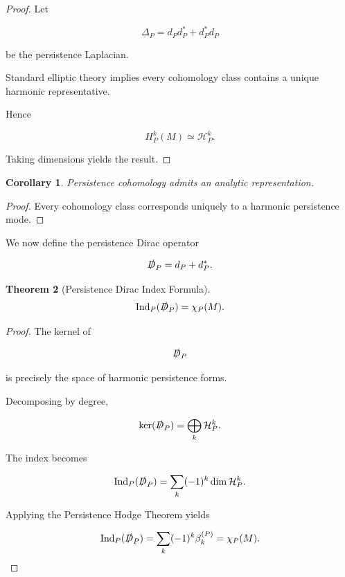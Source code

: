 \documentclass[12pt,oneside]{article}
\newtheorem{theorem}{Theorem}[section] \newtheorem{lemma}[theorem]{Lemma} \newtheorem{proposition}[theorem]{Proposition} \newtheorem{corollary}[theorem]{Corollary}
\theoremstyle{definition}
\begin{document}
\begin{proof}

Let

\[
\Delta_P
=
d_P d_P^\ast
+
d_P^\ast d_P
\]

be the persistence Laplacian.

Standard elliptic theory implies every cohomology class contains a unique harmonic representative.

Hence

\[
H_P^k(M)
\simeq
\mathcal H_P^k.
\]

Taking dimensions yields the result.

\end{proof}

\begin{corollary}

Persistence cohomology admits an analytic representation.

\end{corollary}

\begin{proof}

Every cohomology class corresponds uniquely to a harmonic persistence mode.

\end{proof}

We now define the persistence Dirac operator

\[
\slashed D_P
=
d_P
+
d_P^\ast.
\]

\begin{theorem}[Persistence Dirac Index Formula]

\[
\operatorname{Ind}_P(\slashed D_P)
=
\chi_P(M).
\]

\end{theorem}

\begin{proof}

The kernel of

\[
\slashed D_P
\]

is precisely the space of harmonic persistence forms.

Decomposing by degree,

\[
\ker(\slashed D_P)
=
\bigoplus_{k}
\mathcal H_P^k.
\]

The index becomes

\[
\operatorname{Ind}_P(\slashed D_P)
=
\sum_k
(-1)^k
\dim
\mathcal H_P^k.
\]

Applying the Persistence Hodge Theorem yields

\[
\operatorname{Ind}_P(\slashed D_P)
=
\sum_k
(-1)^k
\beta_k^{(P)}
=
\chi_P(M).
\]

\end{proof}
\end{document}

